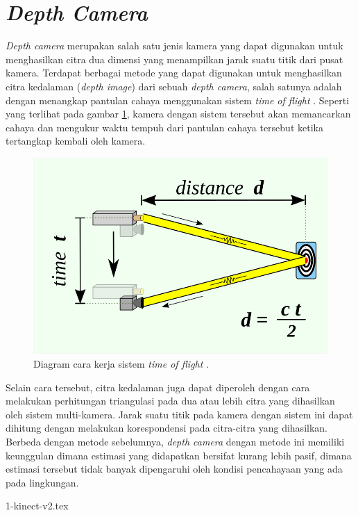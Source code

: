 \section{\emph{Depth Camera}}
\label{sec:depthcamera}

\emph{Depth camera} merupakan salah satu jenis kamera yang dapat digunakan untuk menghasilkan citra dua dimensi yang menampilkan jarak suatu titik dari pusat kamera.
Terdapat berbagai metode yang dapat digunakan untuk menghasilkan citra kedalaman (\emph{depth image}) dari sebuah \emph{depth camera},
  salah satunya adalah dengan menangkap pantulan cahaya menggunakan sistem \emph{time of flight} \citep{cit:idan2001}.
Seperti yang terlihat pada gambar \ref{fig:diagramtimeofflight},
  kamera dengan sistem tersebut akan memancarkan cahaya dan mengukur waktu tempuh dari pantulan cahaya tersebut ketika tertangkap kembali oleh kamera.

\begin{figure}[ht]
  \centering
  \includegraphics[scale=0.2]{gambar/diagram-time-of-flight.png}
  \caption{Diagram cara kerja sistem \emph{time of flight} \citep{url:timeofflight}.}
  \label{fig:diagramtimeofflight}
\end{figure}

Selain cara tersebut,
  citra kedalaman juga dapat diperoleh dengan cara melakukan perhitungan triangulasi pada dua atau lebih citra yang dihasilkan oleh sistem multi-kamera.
Jarak suatu titik pada kamera dengan sistem ini dapat dihitung dengan melakukan korespondensi pada citra-citra yang dihasilkan.
Berbeda dengan metode sebelumnya,
  \emph{depth camera} dengan metode ini memiliki keunggulan dimana estimasi yang didapatkan bersifat kurang lebih pasif,
  dimana estimasi tersebut tidak banyak dipengaruhi oleh kondisi pencahayaan yang ada pada lingkungan.

{1-kinect-v2.tex}
